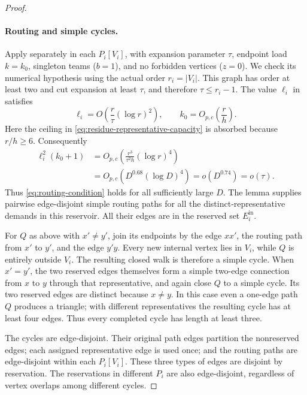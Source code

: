 \begin{proof}
\paragraph{Routing and simple cycles.}
Apply  separately in each $P_i[V_i]$, with
expansion parameter $\tau$, endpoint load $k=k_0$, singleton teams
($b=1$), and no forbidden vertices ($z=0$).  We check its numerical
hypothesis using the actual order $r_i=|V_i|$.  This graph has order
at least two and cut expansion at least $\tau$, and therefore
$\tau\le r_i-1$.  The value $\ell_i$ in  satisfies
\[
  \ell_i=O\!\left(\frac r\tau(\log r)^2\right),
  \qquad k_0=O_{p,c}\!\left(\frac rh\right).
\]
Here the ceiling in \eqref{eq:residue-representative-capacity}
is absorbed because $r/h\ge6$.  Consequently
\begin{equation}\label{eq:residue-routing-margin}
\begin{aligned}
  \ell_i^2(k_0+1)
   &=O_{p,c}\!\left(
        \frac{r^3}{\tau^2h}(\log r)^4\right)\\
   &=O_{p,c}(D^{0.68}(\log D)^4)
     =o(D^{0.74})=o(\tau).
\end{aligned}
\end{equation}
Thus \eqref{eq:routing-condition} holds for all sufficiently large
$D$.  The lemma supplies pairwise edge-disjoint simple routing
paths for all the distinct-representative demands in this reservoir.
All their edges are in the reserved set $E_i^{\mathrm{in}}$.

For $Q$ as above with $x'\ne y'$, join its endpoints by the edge
$xx'$, the routing path from $x'$ to $y'$, and the edge $y'y$.
Every new internal vertex lies in $V_i$, while $Q$ is entirely
outside $V_i$.  The resulting closed walk is therefore a simple
cycle.  When $x'=y'$, the two reserved edges themselves form a
simple two-edge connection from $x$ to $y$ through that
representative, and again close $Q$ to a simple cycle.  Its two
reserved edges are distinct because $x\ne y$.  In this case even a
one-edge path $Q$ produces a triangle; with different
representatives the resulting cycle has at least four edges.
Thus every completed cycle has length at least three.

The cycles are edge-disjoint.  Their original path edges partition
the nonreserved edges; each assigned representative edge is used
once; and the routing paths are edge-disjoint within each $P_i[V_i]$.
These three types of edges are disjoint by reservation.  The
reservations in different $P_i$ are also edge-disjoint, regardless
of vertex overlaps among different cycles.


\end{proof}
